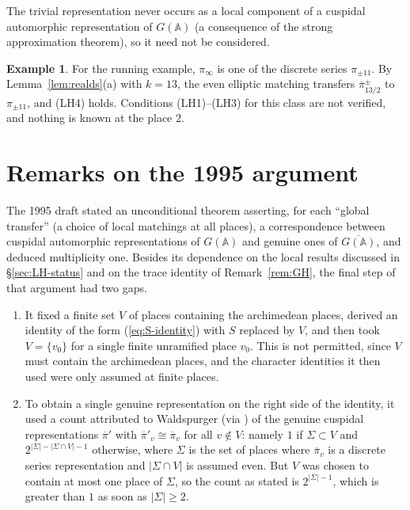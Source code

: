 \documentclass[12pt,letterpaper]{book}
\theoremstyle{plain}
\theoremstyle{definition}
\newtheorem{example}[theorem]{Example}
\theoremstyle{remark}
\theoremstyle{remark}
\begin{document}
The trivial representation never occurs as a local component of a
cuspidal automorphic representation of $G({\mathbb{A}})$ (a consequence of
the strong approximation theorem), so it need not be considered.

\begin{example}
For the running example, $\pi_\infty$ is one of the discrete series
$\pi_{\pm11}$. By Lemma~\ref{lem:realds}(a) with $k=13$, the even elliptic
matching transfers $\overline\pi{}^{\pm}_{13/2}$ to $\pi_{\pm11}$, and (LH4)
holds. Conditions (LH1)--(LH3) for this class are not verified, and nothing
is known at the place $2$.
\end{example}

\section{Remarks on the 1995 argument}\label{sec:1995-argument}

The 1995 draft stated an unconditional theorem asserting, for each
``global transfer'' (a choice of local matchings at all places), a
correspondence between cuspidal automorphic representations of
$G({\mathbb{A}})$ and genuine ones of $\overline{G({\mathbb{A}})}$, and
deduced multiplicity one. Besides its dependence on the local results
discussed in \S\ref{sec:LH-status} and on the trace identity of
Remark~\ref{rem:GH}, the final step of that argument had two gaps.

\begin{enumerate}
\item It fixed a finite set $V$ of places containing the archimedean
places, derived an identity of the form (\ref{eq:S-identity}) with
$S$ replaced by $V$, and then took $V=\{v_0\}$ for a single finite
unramified place $v_0$. This is not permitted, since $V$ must contain the
archimedean places, and the character identities it then used were only
assumed at finite places.

\item To obtain a single genuine representation on the right side of
the identity, it used a count attributed to Waldspurger \cite{Wa2}
(via \cite{PS}) of the genuine cuspidal representations
$\overline{\pi}'$ with $\overline{\pi}'_v\cong\overline{\pi}_v$ for all
$v\notin V$: namely $1$ if $\Sigma\subset V$ and
$2^{|\Sigma|-|\Sigma\cap V|-1}$ otherwise, where $\Sigma$ is the set of
places where $\overline{\pi}_v$ is a discrete series representation and
$|\Sigma\cap V|$ is assumed even. But $V$ was chosen to contain at most
one place of $\Sigma$, so the count as stated is $2^{|\Sigma|-1}$, which
is greater than $1$ as soon as $|\Sigma|\geq 2$.
\end{enumerate}
\end{document}
